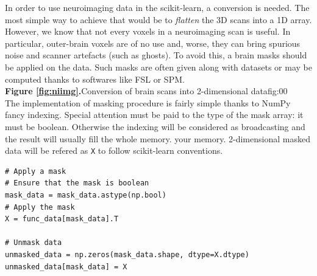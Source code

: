 \documentclass{frontiersSCNS} %
\newcommand{\alex}[1]{\todo[inline, color=green!40]{#1}}
\begin{document}
In order to use neuroimaging data in the scikit-learn, a
conversion is needed. The most simple way to achieve that would be to
\emph{flatten} the 3D scans into a 1D array. However, we know that not every
voxels in a neuroimaging scan is useful. In particular, outer-brain voxels are
of no use and, worse, they can bring spurious noise and scanner artefacts (such
as ghosts). To avoid this, a brain masks should be applied on the data. Such masks
are often given along with datasets or may be computed thanks to softwares like
FSL or SPM.\\

\textbf{Figure \ref{fig:niimg}.}{Conversion of brain scans into 2-dimensional
data}{fig:00}\\

The implementation of masking procedure is fairly simple thanks to NumPy fancy
indexing. Special attention must be paid to the type of the mask array: it must
be boolean. Otherwise the indexing will be considered as broadcasting and the
result will usually fill the whole memory.
your memory.
2-dimensional masked data will be refered as \texttt{X} to follow scikit-learn
conventions.

\begin{lstlisting}
# Apply a mask
# Ensure that the mask is boolean
mask_data = mask_data.astype(np.bool)
# Apply the mask
X = func_data[mask_data].T

# Unmask data
unmasked_data = np.zeros(mask_data.shape, dtype=X.dtype)
unmasked_data[mask_data] = X
\end{lstlisting}






\end{document}

